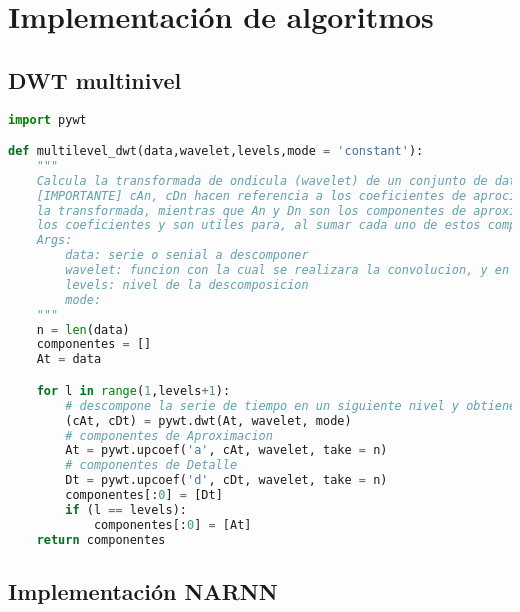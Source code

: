 \chapter{Implementación de algoritmos}
\label{ApB}

\section{DWT multinivel}

\begin{lstlisting}[language=Python]
import pywt

def multilevel_dwt(data,wavelet,levels,mode = 'constant'):
    """
    Calcula la transformada de ondicula (wavelet) de un conjunto de datos o serie de tiempo y devuelve sus componentes
    [IMPORTANTE] cAn, cDn hacen referencia a los coeficientes de aprocimacion y detalle al nivel n respectivamente, que surgen de la descomposicion de la serie por 
    la transformada, mientras que An y Dn son los componentes de aproximacion y detalle al nivel n, se generan al aplicar una reconstruccion parcial (upcoef) de 
    los coeficientes y son utiles para, al sumar cada uno de estos componentes, obtener la senial original.
    Args:
        data: serie o senial a descomponer
        wavelet: funcion con la cual se realizara la convolucion, y en consecuencia la descomposicion
        levels: nivel de la descomposicion
        mode:
    """
    n = len(data)
    componentes = []
    At = data

    for l in range(1,levels+1):
        # descompone la serie de tiempo en un siguiente nivel y obtiene los coeficientes de detalle y aproximacion
        (cAt, cDt) = pywt.dwt(At, wavelet, mode)
        # componentes de Aproximacion 
        At = pywt.upcoef('a', cAt, wavelet, take = n)
        # componentes de Detalle
        Dt = pywt.upcoef('d', cDt, wavelet, take = n)
        componentes[:0] = [Dt]
        if (l == levels):
            componentes[:0] = [At]
    return componentes
\end{lstlisting}

\section{Implementación NARNN}

